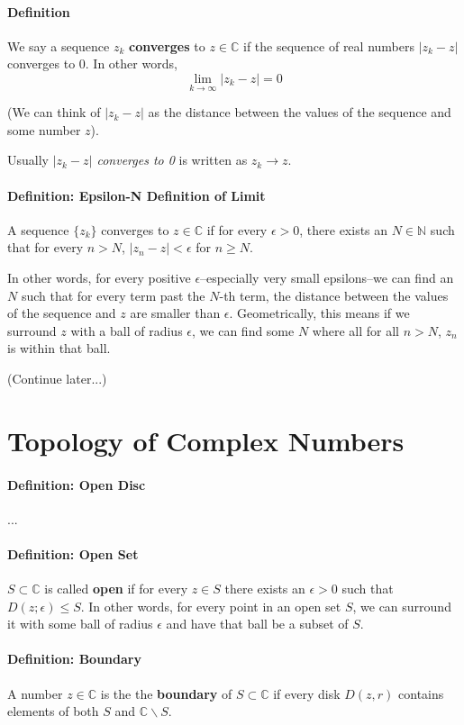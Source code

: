 \documentclass[]{article}
\begin{document}
\paragraph{Definition} We say a sequence ${z_k}$ \textbf{converges} to $z \in \mathbb{C}$ if the sequence of real numbers $|z_k - z|$ converges to 0. In other words,
\[\lim_{k \rightarrow \infty} |z_k - z| = 0\]

(We can think of $|z_k - z|$ as the distance between the values of the sequence and some number $z$).

Usually \textit{$|z_k - z|$ converges to 0} is written as $z_k \rightarrow z$.

\paragraph{Definition: Epsilon-N Definition of Limit}
A sequence $\{z_k\}$ converges to $z \in \mathbb{C}$ if for every $\epsilon > 0$, there exists an $N \in \mathbb{N}$ such that for every $n > N$, $|z_n - z| < \epsilon$ for $n \geq N$.

\bigskip

In other words, for every positive $\epsilon$--especially very small epsilons--we can find an $N$ such that for every term past the $N$-th term, the distance between the values of the sequence and $z$ are smaller than $\epsilon$. Geometrically, this means if we surround $z$ with a ball of radius $\epsilon$, we can find some $N$ where all for all $n > N$, $z_n$ is within that ball.

(Continue later...)

\section{Topology of Complex Numbers}
\paragraph{Definition: Open Disc} ...
\paragraph{Definition: Open Set} $S \subset \mathbb{C}$ is called \textbf{open} if for every $z \in S$ there exists an $\epsilon > 0$ such that $D(z; \epsilon) \leq S$. In other words, for every point in an open set $S$, we can surround it with some ball of radius $\epsilon$ and have that ball be a subset of $S$.

\paragraph{Definition: Boundary} A number $z \in \mathbb{C}$ is the the \textbf{boundary} of $S \subset \mathbb{C}$ if every disk  $D(z, r)$ contains elements of both $S$ and $\mathbb{C}\backslash S$.
\end{document}
